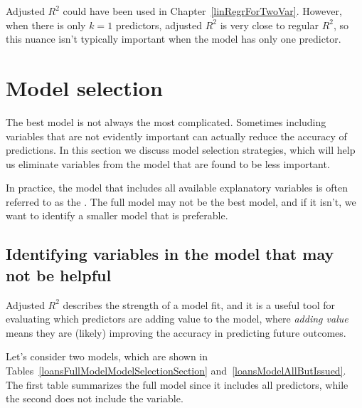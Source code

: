 Adjusted $R^2$ could have been used in
Chapter~\ref{linRegrForTwoVar}.
However, when there is only $k = 1$ predictors,
adjusted $R^2$ is very close to regular $R^2$,
so this nuance isn't typically important when
the model has only one predictor.





\section{Model selection}
\label{model_selection_section}
\label{modelSelection}


The best model is not always the most complicated.
Sometimes including variables that are not evidently
important can actually reduce the accuracy of predictions.
In this section we discuss model selection strategies,
which will help us eliminate variables from the model that
are found to be less important.

In practice, the model that includes all available explanatory
variables is often referred to as the .
The full model may not be the best model, and if it isn't,
we want to identify a smaller model that is preferable.


\subsection{Identifying variables in the model that may
    not be helpful}

Adjusted $R^2$ describes the strength of a model fit,
and it is a useful tool for evaluating which predictors
are adding value to the model, where \emph{adding value}
means they are (likely) improving the accuracy in
predicting future outcomes.

Let's consider two models, which are shown in
Tables~\ref{loansFullModelModelSelectionSection}
and~\ref{loansModelAllButIssued}.
The first table summarizes the full model since it includes
all predictors, while the second does not include the
 variable.

